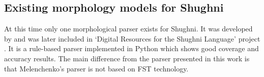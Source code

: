 
\subsection{Existing morphology models for Shughni}
At this time only one morphological parser exists for Shughni. It was developed by \textcite{melenchenko_2021_parser} and was later included in `Digital Resources for the Shughni Language' project \parencite{makarov_digital_2022}. It is a rule-based parser implemented in Python which shows good coverage and accuracy results. The main difference from the parser presented in this work is that Melenchenko's parser is not based on FST technology.

